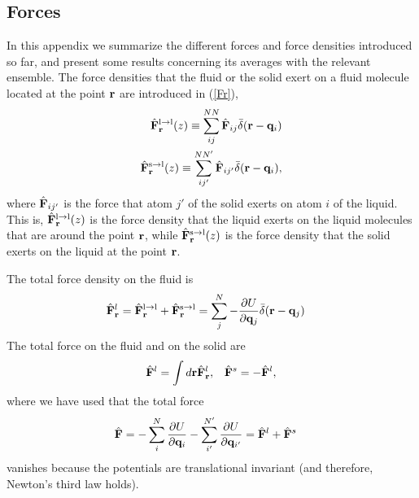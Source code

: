 \documentclass[b5paper,openright,10pt]{book}
\begin{document}
\begin{appendices}
\chapter{Forces}  
\label{Ap:Forces}
In this appendix we summarize the different forces and force densities
introduced so far, and present  some results  concerning its
averages  with the relevant  ensemble.  The  force densities  that the
fluid or the solid exert on a fluid molecule located at the point ${\bf
  r}$ are introduced in (\ref{Fr}),
\begin{eqnarray}
  \hat{\bf F}^{\rm l\to l}_{\bf r}(z) \equiv \sum^{NN}_{ij}\hat{\bf F}_{ij}\bar{\delta}({\bf r}-{\bf q}_i)
\nonumber\\
\hat{\bf F}^{\rm s\to l}_{\bf r}(z) \equiv \sum^{NN'}_{ij'}\hat{\bf F}_{ij'}\bar{\delta}({\bf r}-{\bf q}_i),
\label{Fr_ap}
\end{eqnarray}
where $\hat{\bf  F}_{ij'}$ is the  force that  atom $j'$ of  the solid
exerts on  atom $i$ of  the liquid.   This is, $\hat{\bf  F}^{\rm l\to
  l}_{\bf r}(z) $  is the force density that the  liquid exerts on the
liquid molecules that are around  the point ${\bf r}$, while $\hat{\bf
  F}^{\rm  s\to l}_{\bf  r}(z)$ is  the force  density that  the solid
exerts on the liquid at the point ${\bf r}$.

The total force density on the fluid is
\begin{align}
  \hat{\bf F}^l_{\bf r}&=\hat{\bf F}^{\rm l\to l}_{\bf r}+\hat{\bf F}^{\rm s\to l}_{\bf r} =\sum^{N}_{j}-\frac{\partial U}{\partial {\bf q}_{j}}\bar{\delta}({\bf r}-{\bf q}_j)
\end{align}
The total force on the fluid and on the solid are
\begin{align}
  \hat{\bf F}^l=\int d{\bf r}\hat{\bf F}^l_{\bf r}, &&
  \hat{\bf F}^s= -\hat{\bf F}^l,
\end{align}
where we have used that the total force
\begin{align}
  \hat{\bf F}&=-\sum^N_{i}\frac{\partial U}{\partial {\bf q}_i}
-\sum^{N'}_{i'}\frac{\partial U}{\partial {\bf q}_{i'}}
=\hat{\bf F}^l+\hat{\bf F}^s
\end{align}
 vanishes because the  potentials are translational invariant (and
therefore, Newton's third law holds).


\end{appendices}
\end{document}
